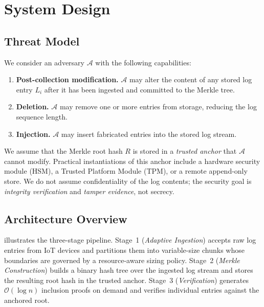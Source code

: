 \documentclass[preprint,12pt]{elsarticle}
\begin{document}
\section{System Design}
\label{sec:design}

\subsection{Threat Model}
\label{sec:threat}

We consider an adversary $\mathcal{A}$ with the following capabilities:

\begin{enumerate}[leftmargin=*, label=(\roman*)]
  \item \textbf{Post-collection modification.}
    $\mathcal{A}$ may alter the content of any stored log entry $L_i$ after it has been ingested and committed to the Merkle tree.

  \item \textbf{Deletion.}
    $\mathcal{A}$ may remove one or more entries from storage, reducing the log sequence length.

  \item \textbf{Injection.}
    $\mathcal{A}$ may insert fabricated entries into the stored log stream.
\end{enumerate}

We assume that the Merkle root hash $R$ is stored in a \emph{trusted anchor} that $\mathcal{A}$ cannot modify.
Practical instantiations of this anchor include a hardware security module (HSM), a Trusted Platform Module (TPM), or a remote append-only store.
We do not assume confidentiality of the log contents; the security goal is \emph{integrity verification} and \emph{tamper evidence}, not secrecy.

\subsection{Architecture Overview}

 illustrates the three-stage pipeline.
Stage~1 (\emph{Adaptive Ingestion}) accepts raw log entries from IoT devices and partitions them into variable-size chunks whose boundaries are governed by a resource-aware sizing policy.
Stage~2 (\emph{Merkle Construction}) builds a binary hash tree over the ingested log stream and stores the resulting root hash in the trusted anchor.
Stage~3 (\emph{Verification}) generates $\mathcal{O}(\log n)$ inclusion proofs on demand and verifies individual entries against the anchored root.
\end{document}
